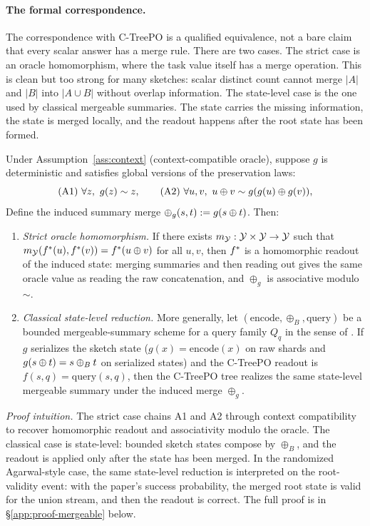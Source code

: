 \paragraph{The formal correspondence.}
The correspondence with C-TreePO is a qualified equivalence, not a bare
claim that every scalar answer has a merge rule. There are two cases.
The strict case is an oracle homomorphism, where the task value itself
has a merge operation. This is clean but too strong for many sketches:
scalar distinct count cannot merge $|A|$ and $|B|$ into $|A\cup B|$
without overlap information. The state-level case is the one used by
classical mergeable summaries. The state carries the missing
information, the state is merged locally, and the readout happens after
the root state has been formed.

\begin{proposition}\label{prop:mergeable-reduction-background}
Under Assumption~\ref{ass:context} (context-compatible oracle), suppose $g$ is deterministic and satisfies global versions of the preservation laws:
\[
\text{(A1)}\ \forall z,\ g(z) \sim z,\qquad
\text{(A2)}\ \forall u,v,\ u \oplus v \sim g(g(u)\oplus g(v)),
\]
Define the induced summary merge $\oplus_g(s,t):=g(s\oplus t)$. Then:
\begin{enumerate}[nosep]
\item \emph{Strict oracle homomorphism.} If there exists
$m_{\mathcal{Y}}:\mathcal{Y}\times\mathcal{Y}\to\mathcal{Y}$ such that
$m_{\mathcal{Y}}(f^\ast(u),f^\ast(v))=f^\ast(u\oplus v)$ for all $u,v$, then
$f^\ast$ is a homomorphic readout of the induced state: merging summaries and
then reading out gives the same oracle value as reading the raw concatenation,
and $\oplus_g$ is associative modulo $\sim$.
\item \emph{Classical state-level reduction.} More generally, let
$(\mathrm{encode},\oplus_B,\mathrm{query})$ be a bounded mergeable-summary
scheme for a query family $Q_q$ in the sense of
\citet{Agarwal2013MergeableTODS}. If $g$ serializes the sketch state
($g(x)=\mathrm{encode}(x)$ on raw shards and
$g(s\oplus t)=s\oplus_B t$ on serialized states) and the C-TreePO readout is
$f(s,q)=\mathrm{query}(s,q)$, then the C-TreePO tree realizes the same
state-level mergeable summary under the induced merge $\oplus_g$.
\end{enumerate}
\end{proposition}

\noindent\textit{Proof intuition.} The strict case chains A1 and A2
through context compatibility to recover homomorphic readout and
associativity modulo the oracle. The classical case is state-level:
bounded sketch states compose by $\oplus_B$, and the readout is
applied only after the state has been merged. In the randomized
Agarwal-style case, the same state-level reduction is interpreted on the
root-validity event: with the paper's success probability, the merged root
state is valid for the union stream, and then the readout is correct. The
full proof is in
\S\ref{app:proof-mergeable} below.

